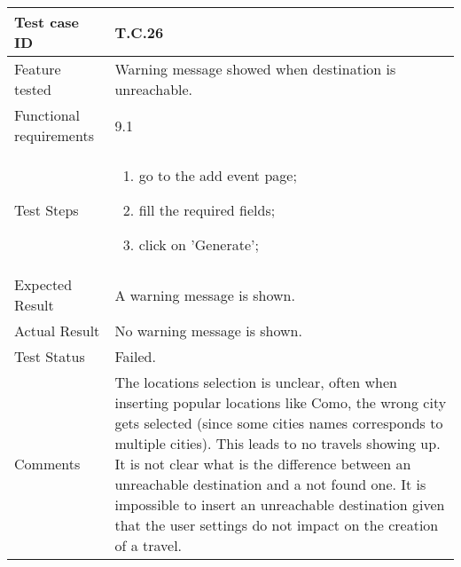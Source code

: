 \begin{table}[H]
	\begin{center}
		\begin{tabular}{ | p{} | p{} | }
		\hline
		Test case ID & T.C.26\\
		\hline
		Feature tested & Warning message showed when destination is unreachable.\\
    	\hline
		Functional requirements & 9.1  \\
		\hline
		Test Steps & 
			\begin{enumerate}
				\item go to the add event page;
				\item fill the required fields;
				\item click on 'Generate';
			\end{enumerate} \\
		\hline
		Expected Result & A warning message is shown.\\
		\hline
		Actual Result & No warning message is shown.\\ 
		\hline
		Test Status & \color{Red}Failed.\\ 
		\hline
		Comments & The locations selection is unclear, often when inserting popular locations like Como, the wrong city gets selected (since some cities names corresponds to multiple cities). This leads to no travels showing up. It is not clear what is the difference between an unreachable destination and a not found one. It is impossible to insert an unreachable destination given that the user settings do not impact on the creation of a travel. \\
		\hline
		
		\end{tabular}
	\end{center}
\end{table}

